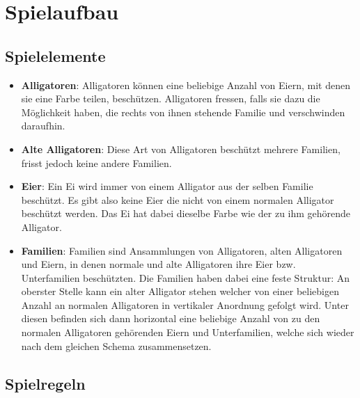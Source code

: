 \section{Spielaufbau}

\subsection{Spielelemente}
	
	\begin{itemize}
	
	\item \textbf{Alligatoren}: Alligatoren können eine beliebige Anzahl von Eiern, mit denen sie eine Farbe teilen, beschützen. Alligatoren fressen, falls sie dazu die Möglichkeit haben, die rechts von ihnen stehende Familie und verschwinden daraufhin.
	
	\item \textbf{Alte Alligatoren}: Diese Art von Alligatoren beschützt mehrere Familien, frisst jedoch keine andere Familien.
	
	\item \textbf{Eier}: Ein Ei wird immer von einem Alligator aus der selben Familie beschützt.  Es gibt also keine Eier die nicht von einem normalen Alligator beschützt werden. Das Ei hat dabei dieselbe Farbe wie der zu ihm gehörende Alligator.
	
	\item \textbf{Familien}: Familien sind Ansammlungen von Alligatoren, alten Alligatoren und Eiern, in denen normale und alte Alligatoren ihre Eier bzw. Unterfamilien beschützten. Die Familien haben dabei eine feste Struktur: An oberster Stelle kann ein alter Alligator stehen welcher von einer beliebigen Anzahl an normalen Alligatoren in vertikaler Anordnung gefolgt wird. Unter diesen befinden sich dann horizontal eine beliebige Anzahl von zu den normalen Alligatoren gehörenden Eiern und Unterfamilien, welche sich wieder nach dem gleichen Schema zusammensetzen.
	
	\end{itemize}	
	
\subsection{Spielregeln}
	

